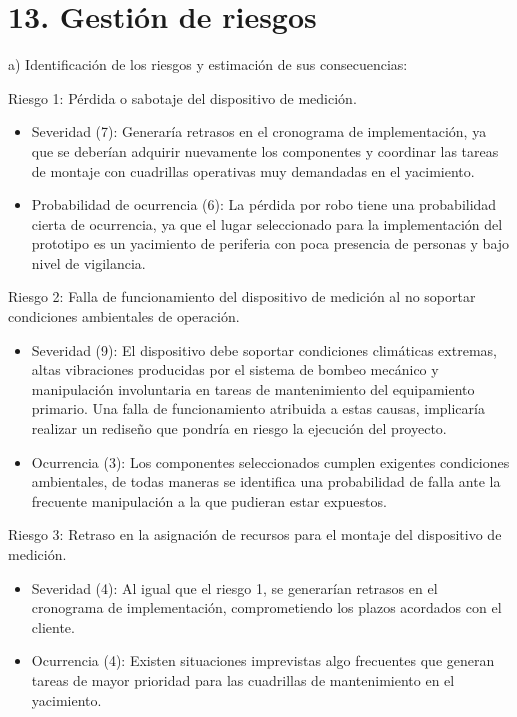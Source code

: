 \documentclass[
11pt, %
]{charter}
\begin{document}
\section{13. Gestión de riesgos}
\label{sec:riesgos}


a) Identificación de los riesgos y estimación de sus consecuencias:
 
Riesgo 1: Pérdida o sabotaje del dispositivo de medición.
\begin{itemize}
	\item Severidad (7): Generaría retrasos en el cronograma de implementación, ya que se deberían adquirir nuevamente los componentes y coordinar las tareas de montaje con cuadrillas operativas muy demandadas en el yacimiento.
	\item Probabilidad de ocurrencia (6): La pérdida por robo tiene una probabilidad cierta de ocurrencia, ya que el lugar seleccionado para la implementación del prototipo es un yacimiento de periferia con poca presencia de personas y bajo nivel de vigilancia.
\end{itemize}   

Riesgo 2: Falla de funcionamiento del dispositivo de medición al no soportar condiciones ambientales de operación.
\begin{itemize}
	\item Severidad (9): El dispositivo debe soportar condiciones climáticas extremas, altas vibraciones producidas por el sistema de bombeo mecánico y manipulación involuntaria en tareas de mantenimiento del equipamiento primario. Una falla de funcionamiento atribuida a estas causas, implicaría realizar un rediseño que pondría en riesgo la ejecución del proyecto. 
	\item Ocurrencia (3): Los componentes seleccionados cumplen exigentes condiciones ambientales, de todas maneras se identifica una probabilidad de falla ante la frecuente manipulación a la que pudieran estar expuestos.
\end{itemize}

Riesgo 3: Retraso en la asignación de recursos para el montaje del dispositivo de medición.
\begin{itemize}
	\item Severidad (4): Al igual que el riesgo 1, se generarían retrasos en el cronograma de implementación, comprometiendo los plazos acordados con el cliente.
	\item Ocurrencia (4): Existen situaciones imprevistas algo frecuentes que generan tareas de mayor prioridad para las cuadrillas de mantenimiento en el yacimiento.
\end{itemize}
\end{document}
